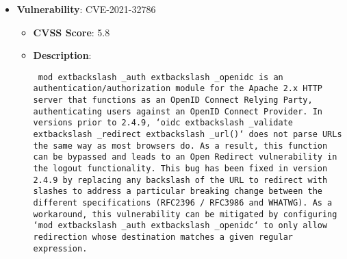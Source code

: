 \documentclass{article}
\begin{document}
\begin{itemize}
    
        \item \textbf{Vulnerability}: CVE-2021-32786
        \begin{itemize}
            \item \textbf{CVSS Score}:  5.8 
            \item \textbf{Description}: \parbox{\linewidth}{\texttt{ mod	extbackslash _auth	extbackslash _openidc is an authentication/authorization module for the Apache 2.x HTTP server that functions as an OpenID Connect Relying Party, authenticating users against an OpenID Connect Provider. In versions prior to 2.4.9, `oidc	extbackslash _validate	extbackslash _redirect	extbackslash _url()` does not parse URLs the same way as most browsers do. As a result, this function can be bypassed and leads to an Open Redirect vulnerability in the logout functionality. This bug has been fixed in version 2.4.9 by replacing any backslash of the URL to redirect with slashes to address a particular breaking change between the different specifications (RFC2396 / RFC3986 and WHATWG). As a workaround, this vulnerability can be mitigated by configuring `mod	extbackslash _auth	extbackslash _openidc` to only allow redirection whose destination matches a given regular expression. }}
        \end{itemize}
    

\end{itemize}
\end{document}
